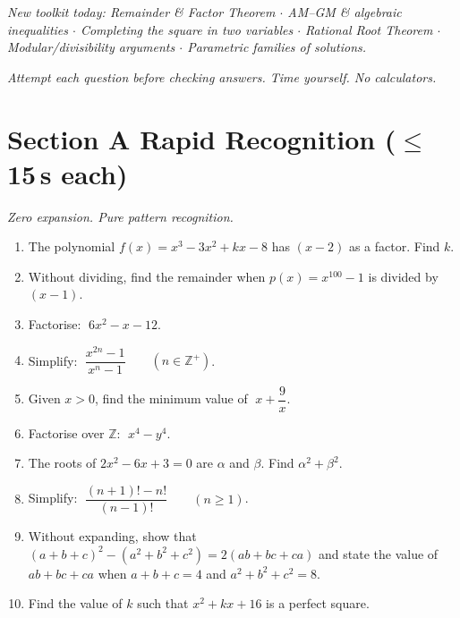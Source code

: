 \documentclass[11pt,a4paper]{article}
\begin{document}
\noindent\textit{New toolkit today: Remainder \& Factor Theorem $\cdot$ AM--GM \& algebraic inequalities $\cdot$ Completing the square in two variables $\cdot$ Rational Root Theorem $\cdot$ Modular/divisibility arguments $\cdot$ Parametric families of solutions.}

\vspace{2pt}
\noindent\textit{Attempt each question before checking answers. Time yourself. No calculators.}

\section*{Section A \quad Rapid Recognition \hfill{\normalfont\small($\leq$15\,s each)}}

\noindent\textit{Zero expansion. Pure pattern recognition.}

\begin{enumerate}

\item The polynomial $f(x)=x^3-3x^2+kx-8$ has $(x-2)$ as a factor. Find $k$.

\item Without dividing, find the remainder when $p(x)=x^{100}-1$ is divided by $(x-1)$.

\item Factorise: $\;6x^2-x-12$.

\item Simplify: $\;\dfrac{x^{2n}-1}{x^n-1}\qquad(n\in\mathbb{Z}^+)$.

\item Given $x>0$, find the minimum value of $\;x+\dfrac{9}{x}$.

\item Factorise over $\mathbb{Z}$: $\;x^4-y^4$.

\item The roots of $2x^2-6x+3=0$ are $\alpha$ and $\beta$. Find $\alpha^2+\beta^2$.

\item Simplify: $\;\dfrac{(n+1)!-n!}{(n-1)!}\qquad(n\geq 1)$.

\item Without expanding, show that $(a+b+c)^2-(a^2+b^2+c^2)=2(ab+bc+ca)$
and state the value of $ab+bc+ca$ when $a+b+c=4$ and $a^2+b^2+c^2=8$.

\item Find the value of $k$ such that $x^2+kx+16$ is a perfect square.

\end{enumerate}
\end{document}
